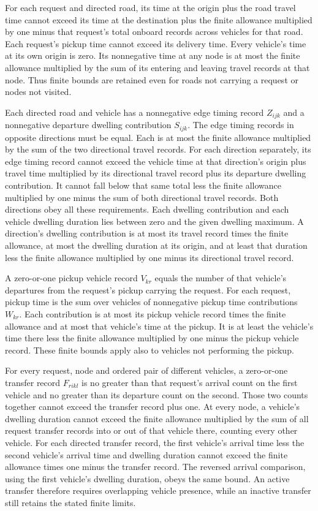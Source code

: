 \documentclass[10pt]{article}
\begin{document}
For each request and directed road, its time at the origin plus the road travel time cannot exceed its time at the destination plus the finite allowance multiplied by one minus that request's total onboard records across vehicles for that road. Each request's pickup time cannot exceed its delivery time. Every vehicle's time at its own origin is zero. Its nonnegative time at any node is at most the finite allowance multiplied by the sum of its entering and leaving travel records at that node. Thus finite bounds are retained even for roads not carrying a request or nodes not visited.

Each directed road and vehicle has a nonnegative edge timing record $Z_{ijk}$ and a nonnegative departure dwelling contribution $S_{ijk}$. The edge timing records in opposite directions must be equal. Each is at most the finite allowance multiplied by the sum of the two directional travel records. For each direction separately, its edge timing record cannot exceed the vehicle time at that direction's origin plus travel time multiplied by its directional travel record plus its departure dwelling contribution. It cannot fall below that same total less the finite allowance multiplied by one minus the sum of both directional travel records. Both directions obey all these requirements. Each dwelling contribution and each vehicle dwelling duration lies between zero and the given dwelling maximum. A direction's dwelling contribution is at most its travel record times the finite allowance, at most the dwelling duration at its origin, and at least that duration less the finite allowance multiplied by one minus its directional travel record.

A zero-or-one pickup vehicle record $V_{kr}$ equals the number of that vehicle's departures from the request's pickup carrying the request. For each request, pickup time is the sum over vehicles of nonnegative pickup time contributions $W_{kr}$. Each contribution is at most its pickup vehicle record times the finite allowance and at most that vehicle's time at the pickup. It is at least the vehicle's time there less the finite allowance multiplied by one minus the pickup vehicle record. These finite bounds apply also to vehicles not performing the pickup.

For every request, node and ordered pair of different vehicles, a zero-or-one transfer record $F_{rikl}$ is no greater than that request's arrival count on the first vehicle and no greater than its departure count on the second. Those two counts together cannot exceed the transfer record plus one. At every node, a vehicle's dwelling duration cannot exceed the finite allowance multiplied by the sum of all request transfer records into or out of that vehicle there, counting every other vehicle. For each directed transfer record, the first vehicle's arrival time less the second vehicle's arrival time and dwelling duration cannot exceed the finite allowance times one minus the transfer record. The reversed arrival comparison, using the first vehicle's dwelling duration, obeys the same bound. An active transfer therefore requires overlapping vehicle presence, while an inactive transfer still retains the stated finite limits.
\end{document}
